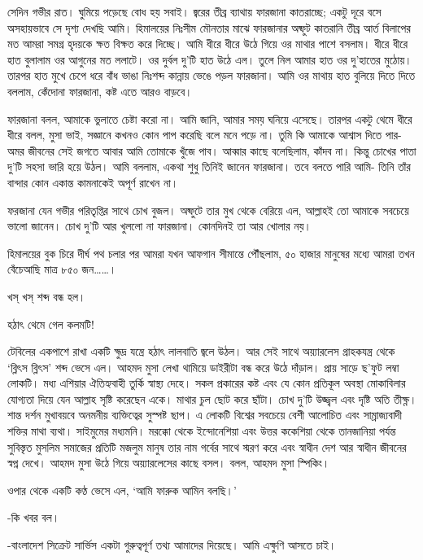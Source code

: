 \documentclass[
]{book}
\begin{document}
সেদিন গভীর রাত। ঘুমিয়ে পড়েছে বোধ হয় সবাই। জ্বরের তীব্র ব্যাথায় ফারজানা কাতরাচ্ছে; একটু দূরে বসে অসহায়ভাবে সে দৃশ্য দেখছি আমি। হিমালয়ের নিঃসীম মৌনতার মাঝে ফারজানার অষ্ফুট কাতরানি তীব্র আর্ত বিলাপের মত আমরা সমগ্র হৃদয়কে ক্ষত বিক্ষত করে দিচ্ছে। আমি ধীরে ধীরে উঠে গিয়ে ওর মাথার পাশে বসলাম। ধীরে ধীরে হাত বুলালাম ওর আগুনের মত ললাটে। ওর দুর্বল দু'টি হাত উঠে এল। তুলে নিল আমার হাত ওর দু'হাতের মুঠোয়। তারপর হাত মুখে চেপে ধরে বাঁধ ভাঙা নিঃশব্দ কান্নায় ভেঙে পড়ল ফারজানা। আমি ওর মাথায় হাত বুলিয়ে দিতে দিতে বললাম, কেঁদোনা ফারজানা, কষ্ট এতে আরও বাড়বে।

ফারজানা বলল, আমাকে ভুলাতে চেষ্টা করো না। আমি জানি, আমার সময় ঘনিয়ে এসেছে। তারপর একটু থেমে ধীরে ধীরে বলল, মুসা ভাই, সজ্ঞানে কখনও কোন পাপ করেছি বলে মনে পড়ে না। তুমি কি আমাকে আশ্বাস দিতে পার-অমর জীবনের সেই জগতে আবার আমি তোমাকে খুঁজে পাব। আব্বার কাছে বলেছিলাম, কাঁদব না। কিন্তু চোখের পাতা দু'টি সহসা ভারি হয়ে উঠল। আমি বললাম, একথা শুধু তিনিই জানেন ফারজানা। তবে বলতে পারি আমি- তিনি তাঁর বান্দার কোন একান্ত কামনাকেই অপূর্ণ রাখেন না।

ফরজানা যেন গভীর পরিতৃপ্তির সাথে চোখ বুজল। অষ্ফুটে তার মুখ থেকে বেরিয়ে এল, আল্লাহই তো আমাকে সবচেয়ে ভালো জানেন। চোখ দু'টি আর খুললো না ফারজানা। কোনদিনই তা আর খোলার নয়।

হিমালয়ের বুক চিরে দীর্ঘ পথ চলার পর আমরা যখন আফগান সীমান্তে পৌঁছলাম, ৫০ হাজার মানুষের মধ্যে আমরা তখন বেঁচেআছি মাত্র ৮৫০ জন\ldots\ldots।

খস্ খস্ শব্দ বন্ধ হল।

হঠাৎ থেমে গেল কলমটি!

টেবিলের একপাশে রাখা একটি ক্ষুদ্র যন্ত্রে হঠাৎ লালবাতি জ্বলে উঠল। আর সেই সাথে অয়্যারলেস গ্রাহকযন্ত্র থেকে `ব্লিৎস ব্লিৎস' শব্দ ভেসে এল। আহমদ মুসা লেখা থামিয়ে ডাইরীটা বন্ধ করে উঠে দাঁড়াল। প্রায় সাড়ে ছ'ফুট লম্বা লোকটি। মধ্য এশিয়ার ঐতিহ্যবাহী তুর্কি স্বাস্থ্য দেহে। সকল প্রকারের কষ্ট এবং যে কোন প্রতিকূল অবস্থা মোকাবিলার যোগ্যতা দিয়ে যেন আল্লাহ সৃষ্টি করেছেন একে। মাথার চুল ছোট করে ছাঁটা। চোখ দু'টি উজ্জ্বল এবং দৃষ্টি অতি তীক্ষ্ণ। শান্ত দর্শন মুখাবয়বে অনমনীয় ব্যক্তিত্বের সুস্পষ্ট ছাপ। এ লোকটি বিশ্বের সবচেয়ে বেশী আলোচিত এবং সাম্রাজ্যবাদী শক্তির মাথা ব্যথা। সাইমুমের মধ্যমনি। মরক্কো থেকে ইন্দোনেশিয়া এবং উত্তর ককেশিয়া থেকে তানজানিয়া পর্যন্ত সুবিস্তৃত মুসলিম সমাজের প্রতিটি মজলুম মানুষ তার নাম গর্বের সাথে স্মরণ করে এবং স্বাধীন দেশ আর স্বাধীন জীবনের স্বপ্ন দেখে। আহমদ মুসা উঠে গিয়ে অয়্যারলেসের কাছে বসল। বলল, আহমদ মুসা স্পিকিং।

ওপার থেকে একটি কণ্ঠ ভেসে এল, `আমি ফারুক আমিন বলছি।'

-কি খবর বল।

-বাংলাদেশ সিক্রেট সার্ভিস একটা গুরুত্বপূর্ণ তথ্য আমাদের দিয়েছে। আমি এক্ষুণি আসতে চাই।
\end{document}
